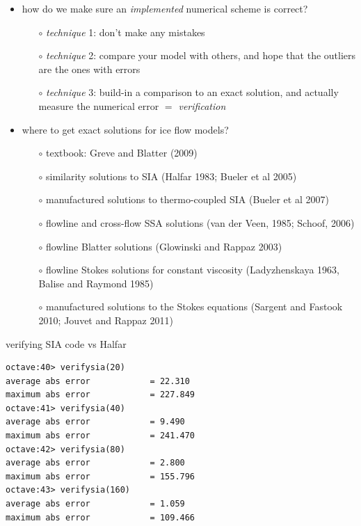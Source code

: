 \documentclass[titlepage,letterpaper,final,11pt]{scrartcl}
\newcommand{\alert}[1]{\emph{#1}}
\begin{document}
\begin{itemize}
\item how do we make sure an \emph{implemented} numerical scheme is correct?
  \begin{itemize}
  \item[$\circ$] \emph{technique} 1: don't make any mistakes
  \item[$\circ$] \emph{technique} 2: compare your model with others, and hope that the outliers are the ones with errors
  \item[$\circ$] \emph{technique} 3: build-in a comparison to an exact solution, and actually measure the numerical error \alert{$=$ verification}
  \end{itemize}
\item where to get exact solutions for ice flow models?
  \begin{itemize}
  \item[$\circ$] textbook: Greve and Blatter (2009)\nocite{GreveBlatter2009}
  \item[$\circ$] similarity solutions to SIA (Halfar 1983\nocite{Halfar83}; Bueler et al 2005\nocite{BLKCB})
  \item[$\circ$] manufactured solutions to thermo-coupled SIA (Bueler et al 2007\nocite{BBL})
  \item[$\circ$] flowline and cross-flow SSA solutions (van der Veen, 1985; Schoof, 2006)\nocite{SchoofStream,vanderVeen85}
  \item[$\circ$] flowline Blatter solutions (Glowinski and Rappaz 2003)\nocite{GlowinskiRappaz}
  \item[$\circ$] flowline Stokes solutions for constant viscosity (Ladyzhenskaya 1963\nocite{Ladyzhenskaya}, Balise and Raymond 1985\nocite{BaliseRaymond1985})
  \item[$\circ$] manufactured solutions to the Stokes equations (Sargent and Fastook 2010; Jouvet and Rappaz 2011)\nocite{JouvetRappaz2011,SargentFastook2010}
  \end{itemize}
\end{itemize}

verifying SIA code vs Halfar

\begin{verbatim}
octave:40> verifysia(20)
average abs error            = 22.310
maximum abs error            = 227.849
octave:41> verifysia(40)
average abs error            = 9.490
maximum abs error            = 241.470
octave:42> verifysia(80)
average abs error            = 2.800
maximum abs error            = 155.796
octave:43> verifysia(160)
average abs error            = 1.059
maximum abs error            = 109.466
\end{verbatim}
\end{document}
